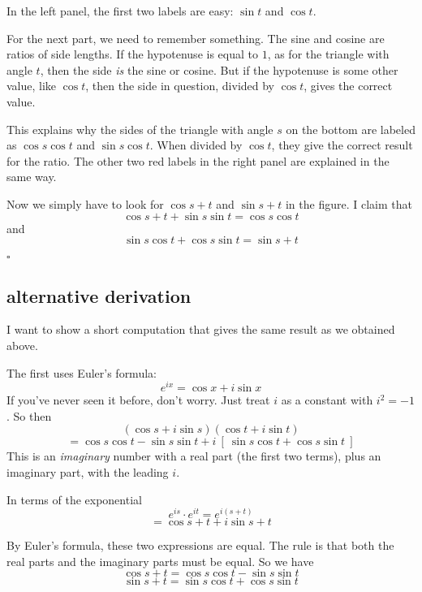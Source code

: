 \documentclass[11pt, oneside]{article}
\begin{document}
In the left panel, the first two labels are easy:  $\sin t$ and $\cos t$.

For the next part, we need to remember something.  The sine and cosine are ratios of side lengths.  If the hypotenuse is equal to $1$, as for the triangle with angle $t$, then the side \emph{is} the sine or cosine.  But if the hypotenuse is some other value, like $\cos t$, then the side in question, divided by $\cos t$, gives the correct value.  

This explains why the sides of the triangle with angle $s$ on the bottom are labeled as $\cos s \cos t$ and $\sin s \cos t$.  When divided by $\cos t$, they give the correct result for the ratio.  The other two red labels in the right panel are explained in the same way.

Now we simply have to look for $\cos s + t$ and $\sin s + t$ in the figure.  I claim that
\[ \cos s + t + \sin s \sin t = \cos s \cos t \]
and 
\[ \sin s \cos t + \cos s \sin t = \sin s + t \]

$\square$

\subsection*{alternative derivation}
I want to show a short computation that gives the same result as we obtained above. 

The first uses Euler's formula:
\[ e^{ix} = \cos x + i \sin x \]
If you've never seen it before, don't worry.  Just treat $i$ as a constant with $i^2 = -1$.  So then
\[ (\cos s + i \sin s)(\cos t + i \sin t) \]
\[ = \cos s \cos t - \sin s \sin t + i \ [ \ \sin s \cos t + \cos s \sin t \ ] \] 
This is an \emph{imaginary} number with a real part (the first two terms), plus an imaginary part, with the leading $i$.

In terms of the exponential
\[ e^{is} \cdot e^{it} = e^{i(s+t)} \]
\[ = \cos s + t + i \sin s + t \]

By Euler's formula, these two expressions are equal.  The rule is that both the real parts and the imaginary parts must be equal.  So we have
\[ \cos s + t = \cos s \cos t - \sin s \sin t \]
\[ \sin s + t = \sin s \cos t + \cos s \sin t \]
\end{document}
